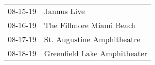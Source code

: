 \begin{supertabular}{p{0.25\columnwidth}p{0.75\columnwidth}}
 08-15-19 &                   Jannus Live \\
 08-16-19 &      The Fillmore Miami Beach \\
 08-17-19 &    St. Augustine Amphitheatre \\
 08-18-19 &  Greenfield Lake Amphitheater \\
\end{supertabular}

